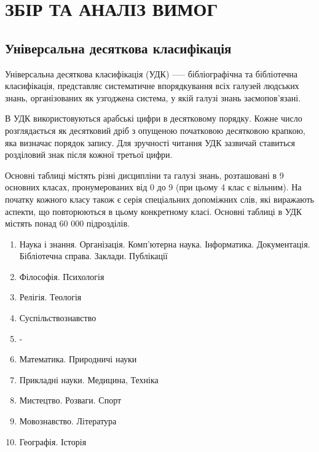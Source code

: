 \documentclass[14pt]{extarticle}
\let\oldsection\section
\renewcommand{\section}{\clearpage\oldsection}
\begin{document}
  \section{ЗБІР ТА АНАЛІЗ ВИМОГ}

  \subsection{Універсальна десяткова класифікація}
  Універсальна десяткова класифікація (УДК) \cite{udc_wiki} —--
  бібліографічна та бібліотечна класифікація,
  представляє систематичне впорядкування всіх галузей людських знань,
  організованих як узгоджена система,
  у якій галузі знань заємопов’язані.
  
  В УДК використовуються арабські цифри в десятковому порядку.
  Кожне число розглядається як десятковий дріб
  з опущеною початковою десятковою крапкою, яка визначає порядок запису.
  Для зручності читання УДК зазвичай ставиться розділовий знак
  після кожної третьої цифри.

  Основні таблиці містять різні дисципліни та галузі знань,
  розташовані в 9 основних класах, пронумерованих від 0 до 9
  (при цьому 4 клас є вільним).
  На початку кожного класу також є серія спеціальних допоміжних слів,
  які виражають аспекти, що повторюються в цьому конкретному класі.
  Основні таблиці в УДК містять понад 60 000 підрозділів.
  \begin{enumerate}
      [labelindent=\dimexpr\parindent*2\relax, leftmargin=*, start=0]
    \item Наука і знання.
    Організація.
    Комп'ютерна наука.
    Інформатика.
    Документація.
    Бібліотечна справа.
    Заклади.
    Публікації
    \item Філософія. Психологія
    \item Релігія. Теологія
    \item Суспільствознавство
    \item -
    \item Математика. Природничі науки
    \item Прикладні науки. Медицина, Техніка
    \item Мистецтво. Розваги. Спорт
    \item Мовознавство. Література
    \item Географія. Історія
  \end{enumerate}
\end{document}
